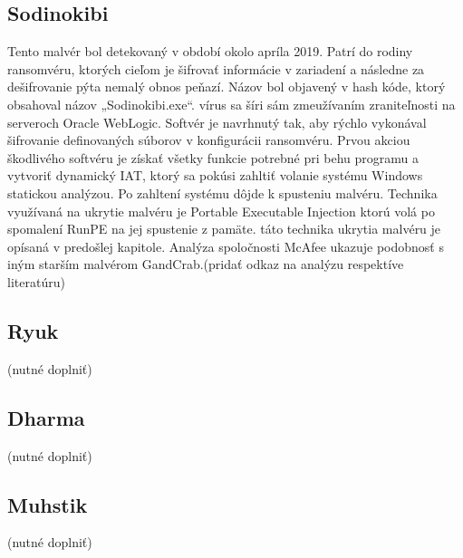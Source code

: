 \subsection{Sodinokibi}
\noindent Tento malvér bol detekovaný v období okolo apríla 2019. Patrí do rodiny ransomvéru, ktorých cieľom je šifrovať informácie v zariadení a následne za dešifrovanie pýta nemalý obnos peňazí. Názov bol objavený v hash kóde, ktorý obsahoval názov „Sodinokibi.exe“. vírus sa šíri sám zmeužívaním zraniteľnosti na serveroch Oracle WebLogic. Softvér je navrhnutý tak, aby rýchlo vykonával šifrovanie definovaných súborov v konfigurácii ransomvéru. Prvou akciou škodlivého softvéru je získať všetky funkcie potrebné pri  behu programu a vytvoriť dynamický IAT, ktorý sa pokúsi zahltiť volanie systému Windows statickou analýzou. Po zahltení systému dôjde k spusteniu malvéru. Technika využívaná na ukrytie malvéru je Portable Executable Injection ktorú volá po spomalení RunPE na jej spustenie z pamäte. táto technika ukrytia malvéru je opísaná v predošlej kapitole. Analýza spoločnosti McAfee ukazuje podobnosť s iným starším malvérom GandCrab.(pridať odkaz na analýzu respektíve literatúru)

\subsection{Ryuk}
\noindent (nutné doplniť)

\subsection{Dharma}
\noindent (nutné doplniť)

\subsection{Muhstik}
\noindent (nutné doplniť)


